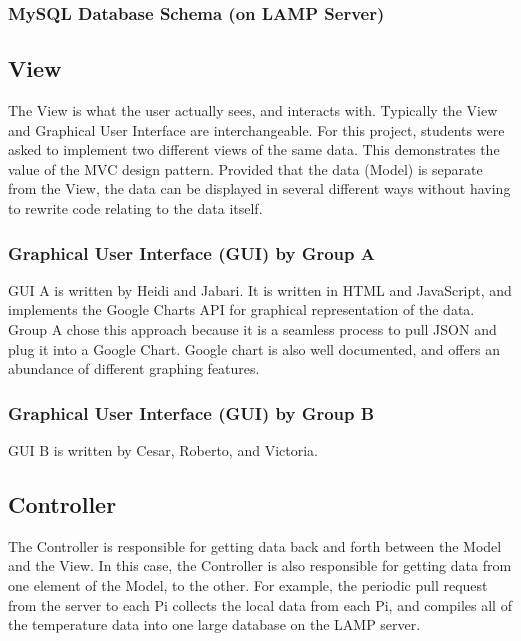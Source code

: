 \documentclass{article}
\begin{document}
			\subsubsection{MySQL Database Schema (on LAMP Server)}
			
		\subsection{View}
			The View is what the user actually sees, and interacts with. Typically the View and Graphical User Interface are interchangeable.
			For this project, students were asked to implement two different views of the same data. This demonstrates the value of
			the MVC design pattern. Provided that the data (Model) is separate from the View, the data can be displayed in several different
			ways without having to rewrite code relating to the data itself.		
		
			\subsubsection{Graphical User Interface (GUI) by Group A}
				GUI A is written by Heidi and Jabari. It is written in HTML and JavaScript, and implements the Google Charts API
				for graphical representation of the data. Group A chose this approach because it is a seamless process to pull JSON
				and plug it into a Google Chart. Google chart is also well documented, and offers an abundance of different graphing features.
			
			\subsubsection{Graphical User Interface (GUI) by Group B}
				GUI B is written by  Cesar, Roberto, and Victoria.
								
			
	\newpage		
			
		\subsection{Controller}
			The Controller is responsible for getting data back and forth between the Model and the View. In this case, the Controller
			is also responsible for getting data from one element of the Model, to the other. For example, the periodic pull request 
			from the server to each Pi collects the local data from each Pi, and compiles all of the temperature data into one large
			database on the LAMP server.
			
\end{document}
